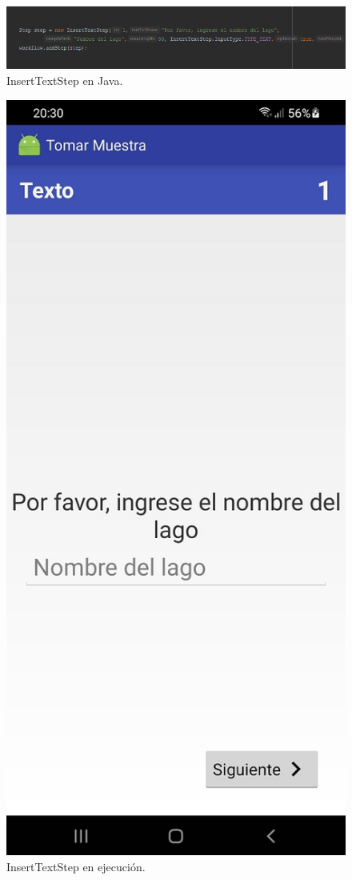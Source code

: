 \begin{figure}[H]
  \centering
    \includegraphics[scale=0.6]{50-anexos/C-steps/insert_text_java.png} 
    \caption{InsertTextStep en Java.}
\end{figure}

\begin{figure}[H]
  \centering
    \includegraphics[scale=0.3]{50-anexos/C-steps/insert_text_screen.jpg} 
    \caption{InsertTextStep en ejecución.}
\end{figure}


